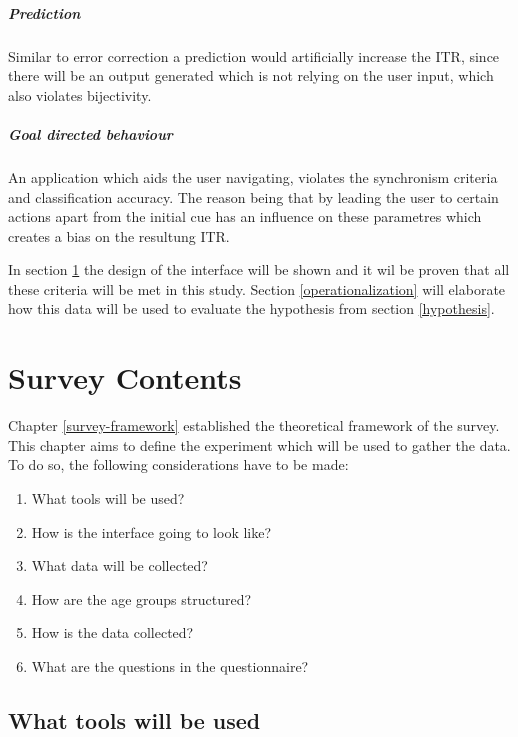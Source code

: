            \paragraph{Prediction} Similar to error correction a prediction would artificially increase the ITR, since there will be an output generated which is not relying on the user input, which also violates bijectivity.

            \paragraph{Goal directed behaviour} An application which aids the user navigating, violates the synchronism criteria and classification accuracy. The reason being that by leading the user to certain actions apart from the initial cue has an influence on these parametres which creates a bias on the resultung ITR.

            \medskip

            In section \ref*{survey-contents} the design of the interface will be shown and it wil be proven that all these criteria will be met in this study. Section \ref{operationalization} will elaborate how this data will be used to evaluate the hypothesis from section \ref{hypothesis}.

    \chapter{Survey Contents}\label{survey-contents}


        Chapter \ref{survey-framework} established the theoretical framework of the survey. This chapter aims to define the experiment which will be used to gather the data. To do so, the following considerations have to be made:

        \begin{enumerate}
            \item What tools will be used?
            \item How is the interface going to look like?
            \item What data will be collected?
            \item How are the age groups structured?
            \item How is the data collected?
            \item What are the questions in the questionnaire?
        \end{enumerate}


        \section{What tools will be used}

